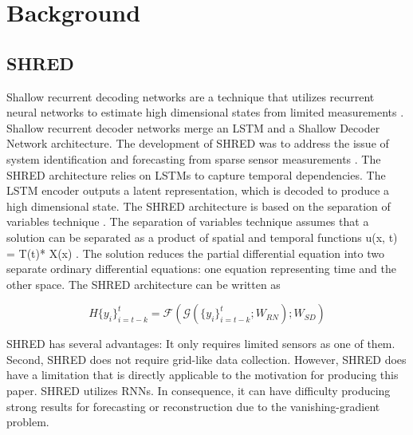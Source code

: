 \documentclass[11pt, a4paper]{article}
\begin{document}
\section{Background} \label{sec:background}

\subsection{SHRED}
Shallow recurrent decoding networks are a technique that utilizes recurrent neural networks to estimate high dimensional states from limited measurements \cite{gao2025sparseidentificationnonlineardynamics}. Shallow recurrent decoder networks merge an LSTM and a Shallow Decoder Network architecture. The development of SHRED was to address the issue of system identification and forecasting from sparse sensor measurements \cite{williams2024sensingshallowrecurrentdecoder}. The SHRED architecture relies on LSTMs to capture temporal dependencies. The LSTM encoder outputs a latent representation, which is decoded to produce a high dimensional state. The SHRED architecture is based on the separation of variables technique \cite{williams2024sensingshallowrecurrentdecoder}. The separation of variables technique assumes that a solution can be separated as a product of spatial and temporal functions u(x, t) = T(t)* X(x) \cite{williams2024sensingshallowrecurrentdecoder}. The solution reduces the partial differential equation into two separate ordinary differential equations: one equation representing time and the other space. The SHRED architecture can be written as 

\begin{equation}
H \{y_i\}_{i=t-k}^t = \mathcal{F} (\mathcal{G}(\{y_i\}_{i=t-k}^t ; W_{RN} ); W_{SD} ) 
\end{equation}

SHRED has several advantages: It only requires limited sensors as one of them. Second, SHRED does not require grid-like data collection. However, SHRED does have a limitation that is directly applicable to the motivation for producing this paper. SHRED utilizes RNNs. In consequence, it can have difficulty producing strong results for forecasting or reconstruction due to the vanishing-gradient problem. 
\end{document}
